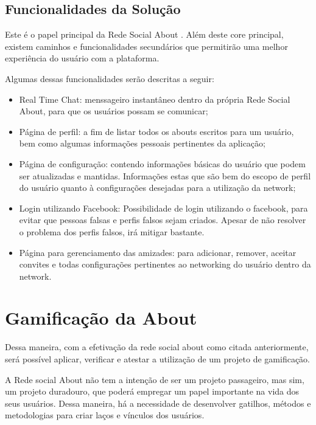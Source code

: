 \subsection{Funcionalidades da Solução}
\label{sub:propostadesolucao}
Este é o papel principal da Rede Social About . Além deste core principal, existem caminhos e funcionalidades
secundários  que permitirão uma melhor experiência do usuário com a plataforma.

Algumas dessas funcionalidades serão descritas a seguir:

\begin{itemize}
    \item Real Time Chat: menssageiro instantâneo dentro da própria Rede Social About, para que os usuários possam se
        comunicar;
    \item Página de perfil: a fim de listar todos os abouts escritos para um usuário, bem como algumas informações
        pessoais pertinentes da aplicação;
    \item Página de configuração: contendo informações básicas do usuário que podem ser atualizadas e mantidas.
        Informações estas que são bem do escopo de perfil do usuário quanto à configurações desejadas
        para a utilização da network;
    \item Login utilizando Facebook: Possibilidade de login utilizando o facebook, para evitar que pessoas
        falsas e perfis falsos sejam criados. Apesar de não resolver o problema dos perfis falsos,
        irá mitigar bastante.
    \item Página para gerenciamento das amizades: para adicionar, remover, aceitar convites e todas configurações
        pertinentes ao networking do usuário dentro da network.
\end{itemize}

\section{Gamificação da About}
\label{sub:gamification}
Dessa maneira, com a efetivação da rede social about como citada anteriormente, será possível aplicar, verificar e
atestar a utilização de um projeto de gamificação.

A Rede social About não tem a intenção de ser um projeto passageiro, mas sim,
um projeto duradouro, que poderá empregar um papel importante na vida dos
seus usuários. Dessa maneira, há a necessidade de desenvolver gatilhos, métodos
e metodologias para criar laços e vínculos dos usuários.

